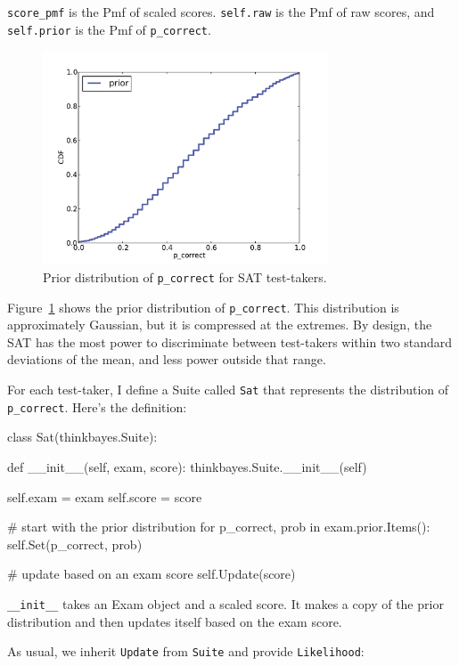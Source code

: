 \documentclass[12pt]{book}
\theoremstyle{exercise}
\begin{document}
\verb"score_pmf" is the Pmf of
scaled scores.   {\tt self.raw} is the Pmf of raw scores, and
{\tt self.prior} is the Pmf of \verb"p_correct".

\begin{figure}
\centerline{\includegraphics[height=2.5in]{figs/sat_prior.pdf}}
\caption{Prior distribution of {\tt p\_correct} for SAT test-takers.}
\label{fig.satprior}
\end{figure}

Figure~\ref{fig.satprior} shows the prior distribution of
\verb"p_correct".  This distribution is approximately Gaussian, but it
is compressed at the extremes.  By design, the SAT has the most power
to discriminate between test-takers within two standard deviations of
the mean, and less power outside that range.

For each test-taker, I define a Suite called {\tt Sat} that
represents the distribution of \verb"p_correct".  Here's the definition:

\begin{code}
class Sat(thinkbayes.Suite):

    def __init__(self, exam, score):
        thinkbayes.Suite.__init__(self)

        self.exam = exam
        self.score = score

        # start with the prior distribution
        for p_correct, prob in exam.prior.Items():
            self.Set(p_correct, prob)

        # update based on an exam score
        self.Update(score)
\end{code}

\verb"__init__" takes an Exam object and a scaled score.  It makes a
copy of the prior distribution and then updates itself based on the
exam score.

As usual, we inherit {\tt Update} from {\tt Suite} and provide
{\tt Likelihood}:
\end{document}

